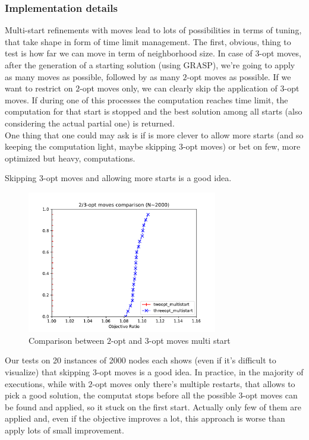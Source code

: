 \subsubsection{Implementation details}
Multi-start refinements with moves lead to lots of possibilities in terms of
tuning, that take shape in form of time limit management. The first, obvious,
thing to test is how far we can move in term of neighborhood size. In case of
$3$-opt moves, after the generation of a starting solution (using GRASP), we're
going to apply as many moves as possible, followed by as many $2$-opt moves as
possible. If we want to restrict on $2$-opt moves only, we can clearly skip the
application of $3$-opt moves. If during one of this processes the computation
reaches time limit, the computation for that start is stopped and the best
solution among all starts (also considering the actual partial one) is
returned.\\ One thing that one could may ask is if is more clever to allow more
starts (and so keeping the computation light, maybe skipping $3$-opt moves) or
bet on few, more optimized but heavy, computations.

\begin{claim}
    Skipping $3$-opt moves and allowing more starts is a good idea.
\end{claim}

\begin{figure}[h!]
    \centering
    \includegraphics[width=0.74\textwidth]{figures/twothree}
    \caption{Comparison between $2$-opt and $3$-opt moves multi start}
\end{figure}

Our tests on 20 instances of 2000 nodes each shows (even if it's difficult to
visualize) that skipping $3$-opt moves is a good idea. In practice, in the
majority of executions, while with $2$-opt moves only there's multiple restarts,
that allows to pick a good solution, the computat stops before all the
possible $3$-opt moves can be found and applied, so it stuck on the first start.
Actually only few of them are applied and, even if the objective improves a lot,
this approach is worse than apply lots of small improvement.\\


